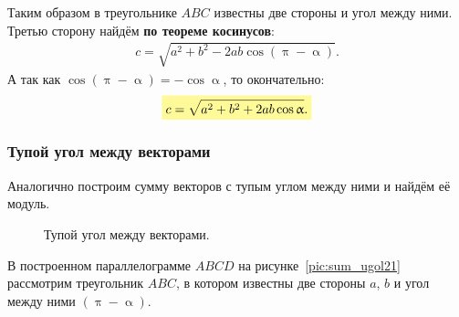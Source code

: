 Таким образом в треугольнике $ABC$ известны две стороны и угол между ними.
Третью сторону найдём \textbf{по теореме косинусов}:
\begin{align}
  c = \sqrt{a^2 + b^2 - 2 a b\cos(\uppi-\upalpha)}.
\end{align}
А так как $\cos(\uppi-\upalpha) = -\cos\upalpha$, то окончательно:
{\large
  \begin{align}
    \hly{c = \sqrt{a^2 + b^2 + 2 a b\cos\upalpha}.}
  \end{align}
}

\clearpage

\subsubsection{Тупой угол между векторами}
Аналогично построим сумму векторов с тупым углом между ними и найдём
её модуль.
\begin{figure}[h]
  \centering
  \caption{\small Тупой угол между векторами.}\label{pic:sum_ugol2}
\end{figure}

В построенном параллелограмме $ABCD$ на рисунке~\ref{pic:sum_ugol21}
рассмотрим треугольник $ABC$,
в котором известны две стороны $a$, $b$ и угол между ними $(\uppi-\upalpha)$.

